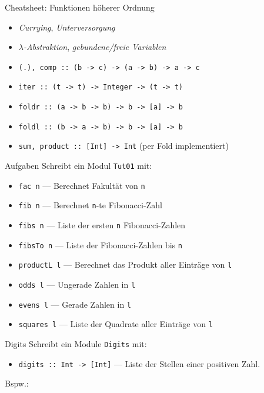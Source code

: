 \documentclass{beamer}
\begin{document}
\begin{frame}{Cheatsheet: Funktionen höherer Ordnung}
	\begin{itemize}
          \item \emph{Currying}, \emph{Unterversorgung}
          \item \emph{$\lambda$-Abstraktion}, \emph{gebundene/freie Variablen}
          \item \texttt{(.), comp :: (b -> c) -> (a -> b) -> a -> c}
          \item \texttt{iter :: (t -> t) -> Integer -> (t -> t)}
          \item \texttt{foldr :: (a -> b -> b) -> b -> [a] -> b}
          \item \texttt{foldl :: (b -> a -> b) -> b -> [a] -> b}
          \item \texttt{sum, product :: [Int] -> Int} (per Fold implementiert)
	\end{itemize}
\end{frame}

\begin{frame}{Aufgaben}
	Schreibt ein Modul \texttt{Tut01} mit:

	\begin{itemize}
		\item \texttt{fac n} --- Berechnet Fakultät von \texttt{n}
		\item \texttt{fib n} --- Berechnet \texttt{n}-te Fibonacci-Zahl
		\item \texttt{fibs n} --- Liste der ersten \texttt{n} Fibonacci-Zahlen
		\item \texttt{fibsTo n} --- Liste der Fibonacci-Zahlen bis \texttt{n}
		\item \texttt{productL l} --- Berechnet das Produkt aller Einträge von \texttt{l}
                \item \texttt{odds l} --- Ungerade Zahlen in \texttt{l}
                \item \texttt{evens l} --- Gerade Zahlen in \texttt{l}
		\item \texttt{squares l} --- Liste der Quadrate aller Einträge von \texttt{l}
	\end{itemize}
\end{frame}

\begin{frame}{Digits}
  Schreibt ein Module \texttt{Digits} mit:

  \begin{itemize}
    \item \texttt{digits :: Int -> [Int]} --- Liste der Stellen einer positiven Zahl.
  \end{itemize}

  Bspw.:

\end{frame}
\end{document}
